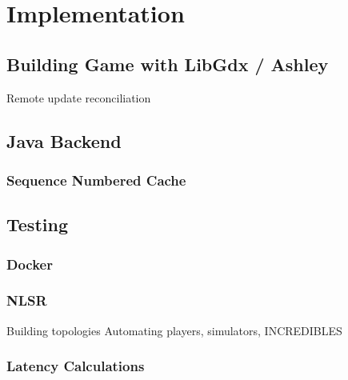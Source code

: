 \chapter{Implementation}
\section{Building Game with LibGdx / Ashley}
Remote update reconciliation

\section{Java Backend}
\subsection{Sequence Numbered Cache}


\section{Testing}
\subsection{Docker}
\subsection{NLSR}
Building topologies
Automating players, simulators, INCREDIBLES
\subsection{Latency Calculations}
